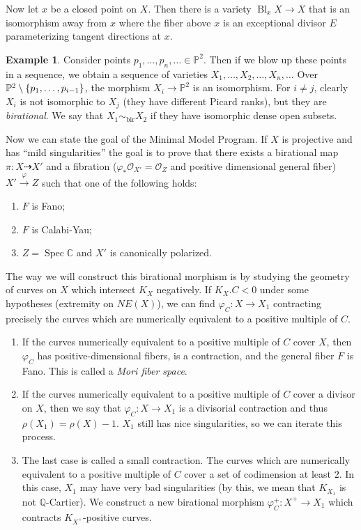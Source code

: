 \documentclass[leqno, openany]{memoir}
\theoremstyle{definition}
\newtheorem{exm}[thm]{Example}
\theoremstyle{remark}
\theoremstyle{plain}
\theoremstyle{definition}
\theoremstyle{remark}
\newcommand{\C}{\mathbb{C}}
\newcommand{\Q}{\mathbb{Q}}
\renewcommand{\P}{\mathbb{P}}
\newcommand{\msc}[1]{\mathscr{#1}}
\newcommand{\mr}[1]{\mathrm{#1}}
\newcommand{\bir}{\sim_{\mr{bir}}}
\DeclareMathOperator{\Bl}{Bl}
\DeclareMathOperator{\Spec}{Spec}
\begin{document}
Now let $x$ be a closed point on $X$. Then there is a variety $\Bl_x X \to X$ that is an isomorphism away from $x$ where the fiber above $x$ is an exceptional divisor $E$ parameterizing tangent directions at $x$.

\begin{exm}
    Consider points $p_1, \ldots, p_n, \ldots \in \P^2$. Then if we blow up these points in a sequence, we obtain a sequence of varieties $X_1, \ldots, X_2, \ldots, X_n, \ldots$ Over $\P^2 \setminus \qty{p_1, \ldots, p_{i-1}}$, the morphism $X_i \to \P^2$ is an isomorphism. For $i \neq j$, clearly $X_i$ is not isomorphic to $X_j$ (they have different Picard ranks), but they are \textit{birational}. We say that $X_1 \bir X_2$ if they have isomorphic dense open subsets.
\end{exm}

Now we can state the goal of the Minimal Model Program. If $X$ is projective and has ``mild singularities'' the goal is to prove that there exists a birational map $\pi \colon X \dashrightarrow X'$ and a fibration ($\varphi_* \msc{O}_{X'} = \msc{O}_Z$ and positive dimensional general fiber) $X' \xrightarrow{\varphi} Z$ such that one of the following holds:
\begin{enumerate}
    \item $F$ is Fano;
    \item $F$ is Calabi-Yau;
    \item $Z = \Spec \C$ and $X'$ is canonically polarized.
\end{enumerate}
The way we will construct this birational morphism is by studying the geometry of curves on $X$ which intersect $K_X$ negatively. If $K_X.C < 0$ under some hypotheses (extremity on $NE(X)$), we can find $\varphi_C \colon X \to X_1$ contracting precisely the curves which are numerically equivalent to a positive multiple of $C$.

\begin{enumerate}
    \item If the curves numerically equivalent to a positive multiple of $C$ cover $X$, then $\varphi_C$ has positive-dimensional fibers, is a contraction, and the general fiber $F$ is Fano. This is called a \textit{Mori fiber space}.
    \item If the curves numerically equivalent to a positive multiple of $C$ cover a divisor on $X$, then we say that $\varphi_C \colon X \to X_1$ is a divisorial contraction and thus $\rho(X_1) = \rho(X) - 1$. $X_1$ still has nice singularities, so we can iterate this process.
    \item The last case is called a small contraction. The curves which are numerically equivalent to a positive multiple of $C$ cover a set of codimension at least $2$. In this case, $X_1$ may have very bad singularities (by this, we mean that $K_{X_1}$ is not $\Q$-Cartier). We construct a new birational morphism $\varphi_C^+ \colon X^+ \to X_1$ which contracts $K_{X^+}$-positive curves.
\end{enumerate}
\end{document}
